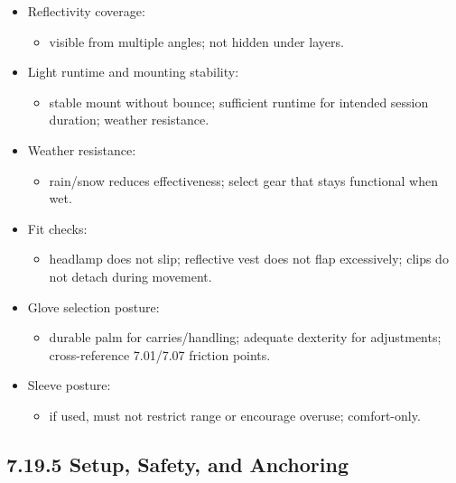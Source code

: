 \documentclass[10pt]{article}
\begin{document}
\begin{itemize}
\item Reflectivity coverage:
  \begin{itemize}
  \item visible from multiple angles; not hidden under layers.
  \end{itemize}
\item Light runtime and mounting stability:
  \begin{itemize}
  \item stable mount without bounce; sufficient runtime for intended session duration; weather resistance.
  \end{itemize}
\item Weather resistance:
  \begin{itemize}
  \item rain/snow reduces effectiveness; select gear that stays functional when wet.
  \end{itemize}
\item Fit checks:
  \begin{itemize}
  \item headlamp does not slip; reflective vest does not flap excessively; clips do not detach during movement.
  \end{itemize}
\item Glove selection posture:
  \begin{itemize}
  \item durable palm for carries/handling; adequate dexterity for adjustments; cross-reference 7.01/7.07 friction points.
  \end{itemize}
\item Sleeve posture:
  \begin{itemize}
  \item if used, must not restrict range or encourage overuse; comfort-only.
  \end{itemize}
\end{itemize}

\subsection*{7.19.5 Setup, Safety, and Anchoring}
{}
\end{document}

